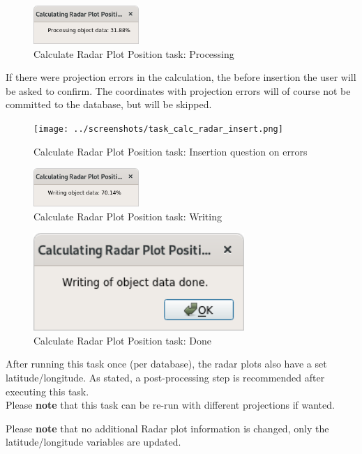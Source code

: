 \begin{figure}[H]
  \center
    \includegraphics[width=4cm,frame]{../screenshots/task_calc_radar_process.png}
  \caption{Calculate Radar Plot Position task: Processing}
\end{figure}

If there were projection errors in the calculation, the before insertion the user will be asked to confirm. The coordinates with projection errors will of course not be committed to the database, but will be skipped.

\begin{figure}[H]
  \center
    \texttt{[image: ../screenshots/task\_calc\_radar\_insert.png]}
  \caption{Calculate Radar Plot Position task: Insertion question on errors}
\end{figure}


\begin{figure}[H]
  \center
    \includegraphics[width=4cm,frame]{../screenshots/task_calc_radar_write.png}
  \caption{Calculate Radar Plot Position task: Writing}
\end{figure}

\begin{figure}[H]
  \center
    \includegraphics[width=8cm,frame]{../screenshots/task_calc_radar_done.png}
  \caption{Calculate Radar Plot Position task: Done}
\end{figure}

After running this task once (per database), the radar plots also have a set latitude/longitude. As stated, a post-processing step is recommended after executing this task. \\

Please \textbf{note} that this task can be re-run with different projections if wanted.

Please \textbf{note} that no additional Radar plot information is changed, only the latitude/longitude variables are updated. 
